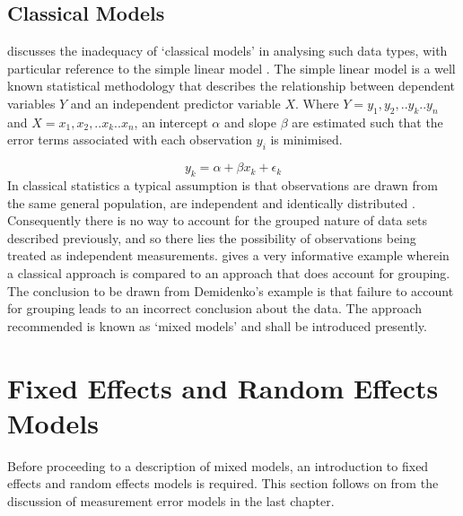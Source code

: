 \documentclass[12pt, a4paper]{report}
\begin{document}
\subsection{Classical Models}
\citet{Demi} discusses the inadequacy of `classical models' in
analysing such data types, with particular reference to the simple
linear model . The simple linear model is a well known statistical
methodology that describes the relationship between dependent
variables $Y$ and an independent predictor variable $X$. Where
$Y={y_{1},y_{2},..y_{k}..y_{n}}$ and
$X={x_{1},x_{2},..x_{k}..x_{n}}$, an intercept $\alpha$ and slope
$\beta$ are estimated such that the error terms associated with
each observation $y_{i}$ is minimised.

\begin{equation}
y_{k} = \alpha + \beta x_{k}+ \epsilon_{k}
\end{equation}
In classical statistics a typical assumption is that observations
are drawn from the same general population, are independent and
identically distributed \citep{Demi}. Consequently there is no way
to account for the grouped nature of data sets described
previously, and so there lies the possibility of observations
being treated as independent measurements. \citet[pg.3]{Demi}
gives a very informative example wherein a classical approach is
compared to an approach that does account for grouping. The
conclusion to be drawn from Demidenko's example is that failure to
account for grouping leads to an incorrect conclusion about the
data. The approach recommended is known as `mixed models' and
shall be introduced presently.

\newpage

\section{Fixed Effects and Random Effects Models}
Before proceeding to a description of mixed models, an
introduction to fixed effects and random effects models is
required. This section follows on from the discussion of
measurement error models in the last chapter.

\end{document}
